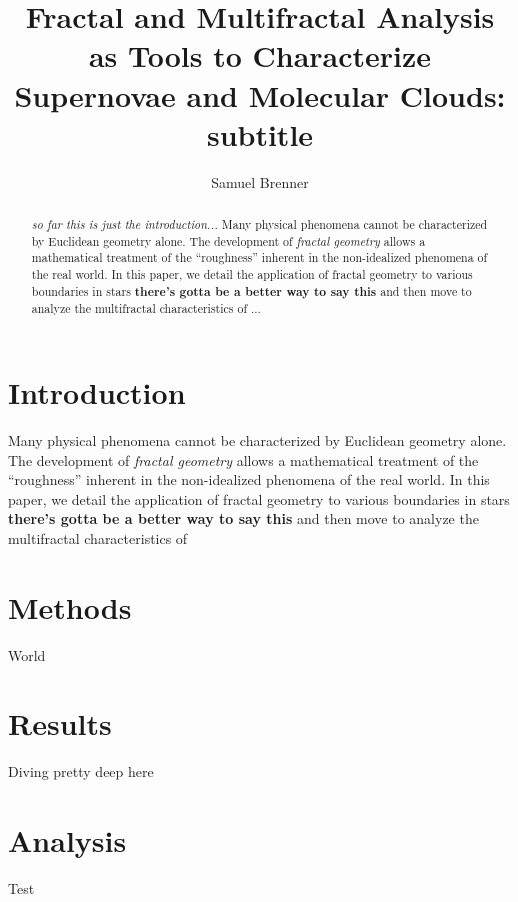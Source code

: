 \documentclass[iop]{emulateapj}
\begin{document}
%
\title{Fractal and Multifractal Analysis as Tools to Characterize Supernovae and Molecular Clouds: \\
subtitle}
%
\author{Samuel Brenner}
%
%
%
%
%
%
\begin{abstract}
\textit{so far this is just the introduction...} Many physical phenomena cannot be characterized by Euclidean geometry alone. The development of \textit{fractal geometry} allows a mathematical treatment of the ``roughness'' inherent in the non-idealized phenomena of the real world. In this paper, we detail the application of fractal geometry to various boundaries in stars \textbf{there's gotta be a better way to say this} and then move to analyze the multifractal characteristics of ...
\end{abstract}
%
%
%
%
%
%

\section{Introduction}
Many physical phenomena cannot be characterized by Euclidean geometry alone. The development of \textit{fractal geometry} allows a mathematical treatment of the ``roughness'' inherent in the non-idealized phenomena of the real world. In this paper, we detail the application of fractal geometry to various boundaries in stars \textbf{there's gotta be a better way to say this} and then move to analyze the multifractal characteristics of 

\section{Methods}
World

\section{Results}
Diving pretty deep here

\section{Analysis}
Test
\end{document}
